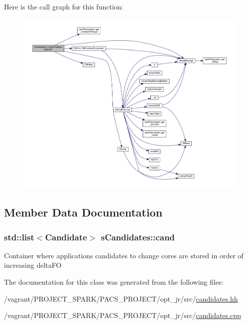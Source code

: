 Here is the call graph for this function\-:
\nopagebreak
\begin{figure}[H]
\begin{center}
\leavevmode
\includegraphics[width=350pt]{classsCandidates_ac5ff86e5acf736ef57a3eb25c0d724ab_cgraph}
\end{center}
\end{figure}




\subsection{Member Data Documentation}
\hypertarget{classsCandidates_a71334f188ac386cd5958508288487832}{
\subsubsection[{cand}]{\setlength{\rightskip}{0pt plus 5cm}std\-::list$<${\bf Candidate}$>$ s\-Candidates\-::cand}}\label{classsCandidates_a71334f188ac386cd5958508288487832}
Container where applications candidates to change cores are stored in order of increasing delta\-F\-O 

The documentation for this class was generated from the following files\-:\begin{DoxyCompactItemize}
\item 
/vagrant/\-P\-R\-O\-J\-E\-C\-T\-\_\-\-S\-P\-A\-R\-K/\-P\-A\-C\-S\-\_\-\-P\-R\-O\-J\-E\-C\-T/opt\-\_\-jr/src/\hyperlink{candidates_8hh}{candidates.\-hh}\item 
/vagrant/\-P\-R\-O\-J\-E\-C\-T\-\_\-\-S\-P\-A\-R\-K/\-P\-A\-C\-S\-\_\-\-P\-R\-O\-J\-E\-C\-T/opt\-\_\-jr/src/\hyperlink{candidates_8cpp}{candidates.\-cpp}\end{DoxyCompactItemize}
